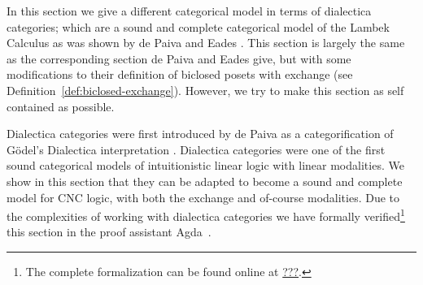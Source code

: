 \newcommand{\Set}{\mathsf{Set}}
\newcommand{\Dial}[2]{\mathsf{Dial}_{#1}(#2)}

In this section we give a different categorical model in terms of
dialectica categories; which are a sound and complete categorical
model of the Lambek Calculus as was shown by de Paiva and Eades
\cite{dePaiva2018}. This section is largely the same as the
corresponding section de Paiva and Eades give, but with some
modifications to their definition of biclosed posets with exchange
(see Definition~\ref{def:biclosed-exchange}).  However, we try to make
this section as self contained as possible.

Dialectica categories were first introduced by de Paiva as a
categorification of G\"odel's Dialectica interpretation
\cite{depaiva1990}.  Dialectica categories were one of the first sound
categorical models of intuitionistic linear logic with linear
modalities.  We show in this section that they can be adapted to
become a sound and complete model for CNC logic, with both the
exchange and of-course modalities.  Due to the complexities of working
with dialectica categories we have formally verified\footnote{The
  complete formalization can be found online at \url{???}.}  this
section in the proof assistant Agda~\cite{bove2009}.

